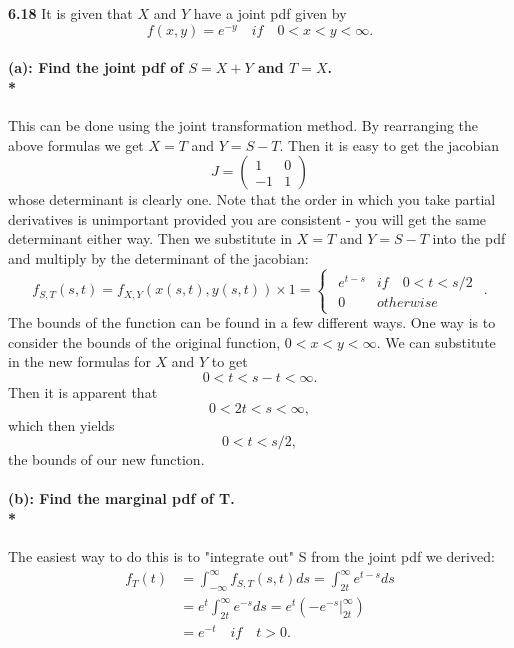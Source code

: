 {\bf 6.18}
It is given that $X$ and $Y$ have a joint pdf given by \begin{equation}f(x,y)=e^{-y} \quad if \quad 0<x<y<\infty. \end{equation} 
\paragraph{(a): Find the joint pdf of $S=X+Y$ and $T=X$. \\*}
This can be done using the joint transformation method.  
By rearranging the above formulas we get $X=T$ and $Y=S-T$.  
Then it is easy to get the jacobian \begin{equation} J = \left(\begin{array}{cc} 1 & 0 \\ -1 & 1 \end{array}\right) \end{equation}  
whose determinant is clearly one. 
Note that the order in which you take partial derivatives is unimportant provided you are consistent - you will get the same determinant either way. Then we substitute in $X=T$ and $Y=S-T$ into the pdf and multiply by the determinant of the jacobian:  
\begin{equation} f_{S,T}(s,t)=f_{X,Y}(x(s,t),y(s,t))\times 1= \begin{cases}  \begin{array}{lr} e^{t-s} & if \quad  0<t<s/2 \\ 0 & otherwise \end{array}\end{cases}. \end{equation} 
The bounds of the function can be found in a few different ways.  One way is to consider the bounds of the original function, $0<x<y<\infty$.  We can substitute in the new formulas for $X$ and $Y$ to get \begin{equation} 0<t<s-t<\infty. \end{equation}  Then it is apparent that \begin{equation} 0<2t<s<\infty, \end{equation} which then yields \begin{equation} 0<t<s/2, \end{equation} the bounds of our new function.  
\paragraph{(b):  Find the marginal pdf of T.\\*} 
The easiest way to do this is to "integrate out" S from the joint pdf we derived:  
\begin{equation} \begin{split}f_T(t) & = \int_{-\infty}^{\infty}f_{S,T}(s,t)ds = \int_{2t}^{\infty}e^{t-s}ds \\ 
&=e^t\int_{2t}^{\infty}e^{-s}ds=e^t(-e^{-s}\rvert^\infty_{2t}) \\ & =e^{-t} \quad if \quad t>0.  \end{split}\end{equation} 
